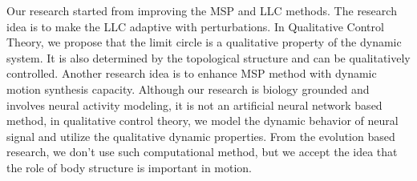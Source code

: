 Our research started from improving the MSP and LLC methods.
The research idea is to make the LLC adaptive with perturbations. 
In Qualitative Control Theory, we propose that the limit circle is a qualitative property of the dynamic system.
It is also determined by the topological structure and can be qualitatively controlled.
Another research idea is to enhance MSP method with dynamic motion synthesis capacity. 
Although our research is biology grounded and involves neural activity modeling, 
it is not an artificial neural network based method, 
in qualitative control theory, 
we model the dynamic behavior of neural signal and utilize the qualitative dynamic properties. 
From the evolution based research, we don't use such computational method, 
but we accept the idea that the role of body structure is important in motion.







